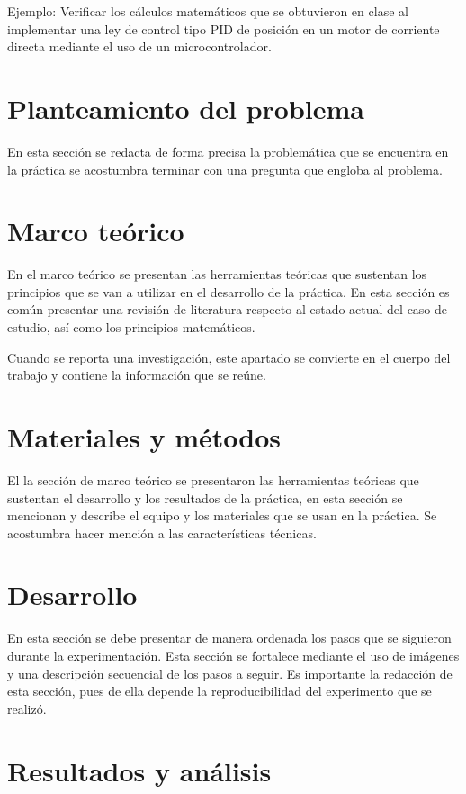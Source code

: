 \documentclass[times,5p, twocolumn]{elsarticle}
\begin{document}
Ejemplo: Verificar los cálculos matemáticos que se obtuvieron en clase al implementar una ley de control tipo PID de posición en un motor de corriente directa mediante el uso de un microcontrolador.

\section{Planteamiento del problema}
En esta sección se redacta de forma precisa la problemática que se encuentra en la práctica se acostumbra terminar con una pregunta que engloba al problema.


\section{Marco teórico}
En el marco teórico se presentan las herramientas teóricas que sustentan los principios que se van a utilizar en el desarrollo de la práctica. En esta sección es común presentar una revisión de literatura respecto al estado actual del caso de estudio, así como los principios matemáticos. 

Cuando se reporta una investigación, este apartado se convierte en el cuerpo del trabajo y contiene la información que se reúne.

\section{Materiales y métodos}

El la sección de marco teórico se presentaron las herramientas teóricas que sustentan el desarrollo y los resultados de la práctica, en esta sección se mencionan y describe el equipo y los materiales que se usan en la práctica. Se acostumbra hacer mención a las características técnicas.

\section{Desarrollo}

En esta sección se debe presentar de manera ordenada los pasos que se siguieron durante la experimentación. Esta sección se fortalece mediante el uso de imágenes y una descripción secuencial de los pasos a seguir. Es importante la redacción de esta sección, pues de ella depende la reproducibilidad del experimento que se realizó.

\section{Resultados y análisis}
\end{document}
